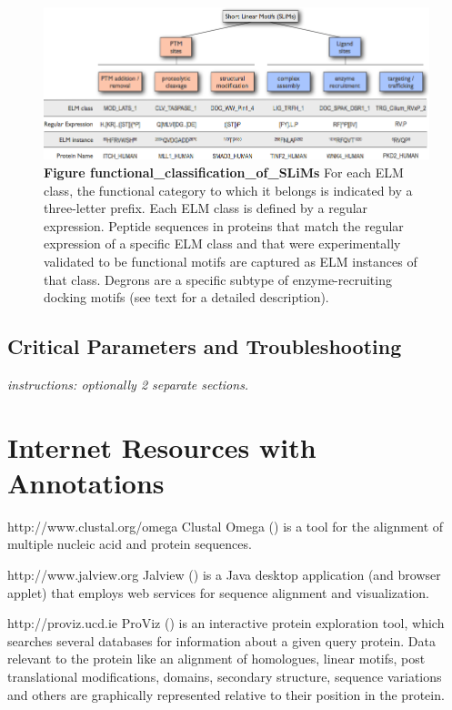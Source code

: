 \begin{figure}[h!]
\centering
\includegraphics[width=\textwidth]{Figures/functional_classification_of_SLiMs.png}
\caption{
\textbf{Figure functional\_classification\_of\_SLiMs} For each ELM
class, the functional category to which it belongs is indicated by a
three-letter prefix. Each ELM class is defined by a regular expression.
Peptide sequences in proteins that match the regular expression of a
specific ELM class and that were experimentally validated to be
functional motifs are captured as ELM instances of that class. Degrons
are a specific subtype of enzyme-recruiting docking motifs (see text for
a detailed description).
}
\end{figure}

\subsection{Critical Parameters and
Troubleshooting}\label{critical-parameters-and-troubleshooting}

\emph{instructions: optionally 2 separate sections.}

\section{Internet Resources with
Annotations}\label{internet-resources-with-annotations}

http://www.clustal.org/omega Clustal Omega (\cite{21988835}) is a tool
for the alignment of multiple nucleic acid and protein sequences.

http://www.jalview.org Jalview (\cite{19151095}) is a Java desktop
application (and browser applet) that employs web services for sequence
alignment and visualization.

http://proviz.ucd.ie ProViz (\cite{27085803}) is an interactive protein
exploration tool, which searches several databases for information about
a given query protein. Data relevant to the protein like an alignment of
homologues, linear motifs, post translational modifications, domains,
secondary structure, sequence variations and others are graphically
represented relative to their position in the protein.
